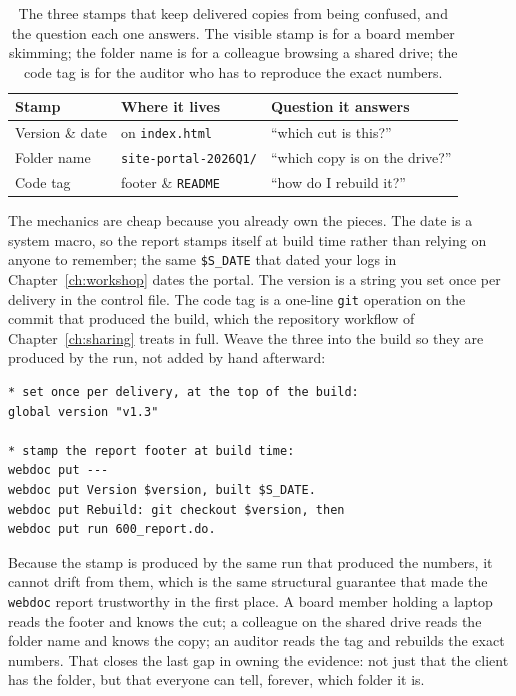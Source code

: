 \documentclass[
    a4paper,
    fontsize=10pt,
    twoside=true,
    numbers=noenddot,
]{kaobook}
\begin{document}
\begin{table}[htbp]
\centering
\footnotesize
\caption[What to stamp on a delivered portal]{The three stamps that keep delivered copies from being confused, and the question each one answers. The visible stamp is for a board member skimming; the folder name is for a colleague browsing a shared drive; the code tag is for the auditor who has to reproduce the exact numbers.}
\label{tab:stamps}
\begin{tabular}{lll}
\hline
Stamp & Where it lives & Question it answers \\
\hline
Version \& date & on \texttt{index.html} & \enquote{which cut is this?} \\
Folder name     & \texttt{site-portal-2026Q1/} & \enquote{which copy is on the drive?} \\
Code tag        & footer \& \texttt{README} & \enquote{how do I rebuild it?} \\
\hline
\end{tabular}
\end{table}

The mechanics are cheap because you already own the pieces. The date is a system macro, so the report stamps itself at build time rather than relying on anyone to remember; the same \texttt{\$S\_DATE} that dated your logs in Chapter~\ref{ch:workshop} dates the portal. The version is a string you set once per delivery in the control file. The code tag is a one-line \texttt{git} operation on the commit that produced the build, which the repository workflow of Chapter~\ref{ch:sharing} treats in full. Weave the three into the build so they are produced by the run, not added by hand afterward:
{\footnotesize
\begin{verbatim}
* set once per delivery, at the top of the build:
global version "v1.3"

* stamp the report footer at build time:
webdoc put ---
webdoc put Version $version, built $S_DATE.
webdoc put Rebuild: git checkout $version, then
webdoc put run 600_report.do.
\end{verbatim}
}
Because the stamp is produced by the same run that produced the numbers, it cannot drift from them, which is the same structural guarantee that made the \texttt{webdoc} report trustworthy in the first place. A board member holding a laptop reads the footer and knows the cut; a colleague on the shared drive reads the folder name and knows the copy; an auditor reads the tag and rebuilds the exact numbers. That closes the last gap in owning the evidence: not just that the client has the folder, but that everyone can tell, forever, which folder it is.
\end{document}
